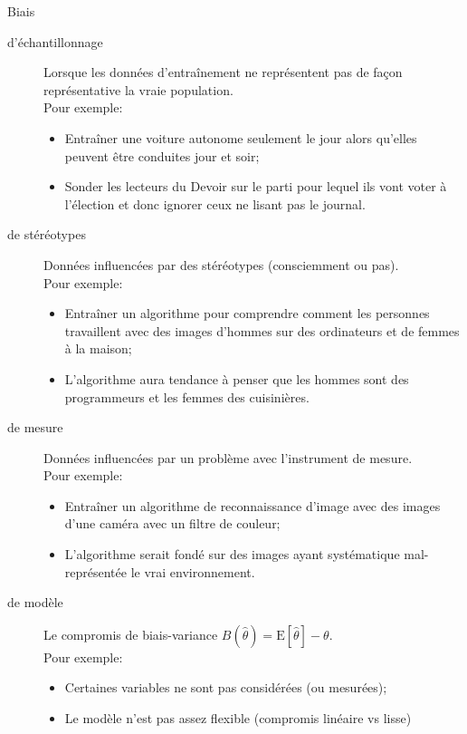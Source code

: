 \documentclass[10pt, french]{article}
\begin{document}
\begin{multicols*}{3}
\begin{conceptgen}{Biais}
\begin{description}
	\item[d'échantillonnage]	Lorsque les données d'entraînement ne représentent pas de façon représentative la vraie population.\\
		Pour exemple:
		\begin{itemize}[leftmargin = *]
		\item	Entraîner une voiture autonome seulement le jour alors qu'elles peuvent être conduites jour et soir;
		\item	Sonder les lecteurs du Devoir sur le parti pour lequel ils vont voter à l'élection et donc ignorer ceux ne lisant pas le journal.
		\end{itemize}
	\item[de stéréotypes]	Données influencées par des stéréotypes (consciemment ou pas).\\
		Pour exemple:
		\begin{itemize}[leftmargin = *]
		\item	Entraîner un algorithme pour comprendre comment les personnes travaillent avec des images d'hommes sur des ordinateurs et de femmes à la maison;
		\item	L'algorithme aura tendance à penser que les hommes sont des programmeurs et les femmes des cuisinières.
		\end{itemize}
	\item[de mesure]	Données influencées par un problème avec l'instrument de mesure.\\
		Pour exemple:
		\begin{itemize}[leftmargin = *]
		\item	Entraîner un algorithme de reconnaissance d'image avec des images d'une caméra avec un filtre de couleur;
		\item	L'algorithme serait fondé sur des images ayant systématique mal-représentée le vrai environnement.
		\end{itemize}
	\item[de modèle]	Le compromis de biais-variance $B(\hat{\theta}) = \text{E}[\hat{\theta}] - \theta$.\\
		Pour exemple:
		\begin{itemize}[leftmargin = *]
		\item	Certaines variables ne sont pas considérées (ou mesurées);
		\item	Le modèle n'est pas assez flexible (compromis linéaire vs lisse)
		\end{itemize}
\end{description}
\end{conceptgen}


\end{multicols*}
\end{document}

